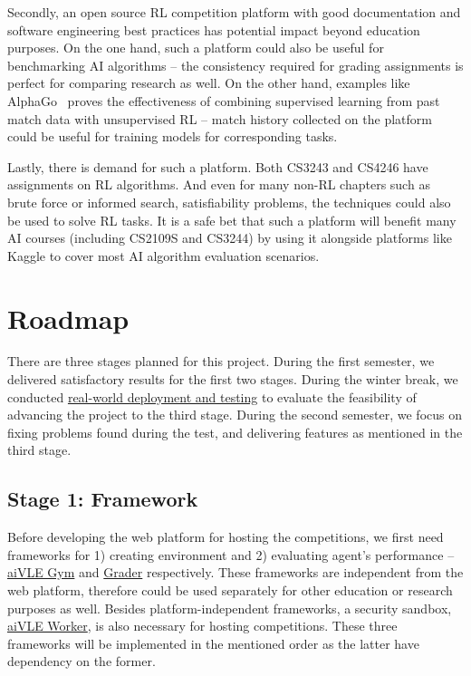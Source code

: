 Secondly, an open source RL competition platform with good documentation and software engineering best practices has potential impact beyond education purposes. On the one hand, such a platform could also be useful for benchmarking AI algorithms – the consistency required for grading assignments is perfect for comparing research as well. On the other hand, examples like AlphaGo~\cite{alphago} proves the effectiveness of combining supervised learning from past match data with unsupervised RL – match history collected on the platform could be useful for training models for corresponding tasks. 

Lastly, there is demand for such a platform. Both CS3243 and CS4246 have assignments on RL algorithms. And even for many non-RL chapters such as brute force or informed search, satisfiability problems, the techniques could also be used to solve RL tasks. It is a safe bet that such a platform will benefit many AI courses (including CS2109S and CS3244) by using it alongside platforms like Kaggle to cover most AI algorithm evaluation scenarios.

\section{Roadmap}
There are three stages planned for this project. During the first semester, we delivered satisfactory results for the first two stages. During the winter break, we conducted \hyperref[ch:deployment-and-testing]{real-world deployment and testing} to evaluate the feasibility of advancing the project to the third stage. During the second semester, we focus on fixing problems found during the test, and delivering features as mentioned in the third stage.

\subsection{Stage 1: Framework}
Before developing the web platform for hosting the competitions, we first need frameworks for 1) creating environment and 2) evaluating agent’s performance – \hyperref[ch:aivle-gym]{aiVLE Gym} and \hyperref[ch:aivle-grader]{Grader} respectively. These frameworks are independent from the web platform, therefore could be used separately for other education or research purposes as well.
Besides platform-independent frameworks, a security sandbox, \hyperref[ch:aivle-worker]{aiVLE Worker}, is also necessary for hosting competitions. These three frameworks will be implemented in the mentioned order as the latter have dependency on the former.

